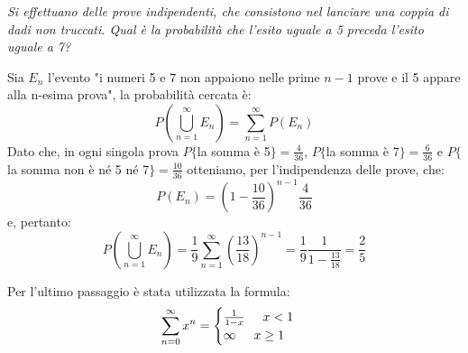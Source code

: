 \begin{Example}{}{}
    \textit{Si effettuano delle prove indipendenti, che consistono nel lanciare una coppia di dadi non truccati. Qual è la probabilità che l’esito uguale a 5 preceda l’esito uguale a 7?}

    Sia $E_n$ l’evento "i numeri 5 e 7 non appaiono nelle prime $n-1$ prove e il 5 appare alla n-esima prova", la probabilità cercata è:
    \begin{equation*}
        P(\bigcup^\infty_{n=1}E_n)=\sum^\infty_{n=1}P(E_n)
    \end{equation*}
    Dato che, in ogni singola prova $P\{$la somma è 5$\}=\frac{4}{36}$, $P\{$la somma è 7$\}=\frac{6}{36}$ e $P\{$la somma non è né 5 né 7$\}=\frac{10}{36}$ otteniamo, per l’indipendenza delle prove, che:
    \begin{equation*}
        P(E_n) = (1-\frac{10}{36})^{n-1}\frac{4}{36}
    \end{equation*}
    e, pertanto:
    \begin{equation*}
        P(\bigcup^\infty_{n=1}E_n)=\frac{1}{9}\sum^\infty_{n=1}(\frac{13}{18})^{n-1}=\frac{1}{9}\frac{1}{1-\frac{13}{18}}=\frac{2}{5}
    \end{equation*}

    \begin{osservation}
        Per l'ultimo passaggio è stata utilizzata la formula:
        \begin{equation*}
            \sum^\infty_{n=0}x^n=\begin{cases}\frac{1}{1-x}\hspace{0.5cm}x<1\\\infty\hspace{0.5cm}x\geq1\end{cases}
        \end{equation*}
    \end{osservation}
\end{Example}



